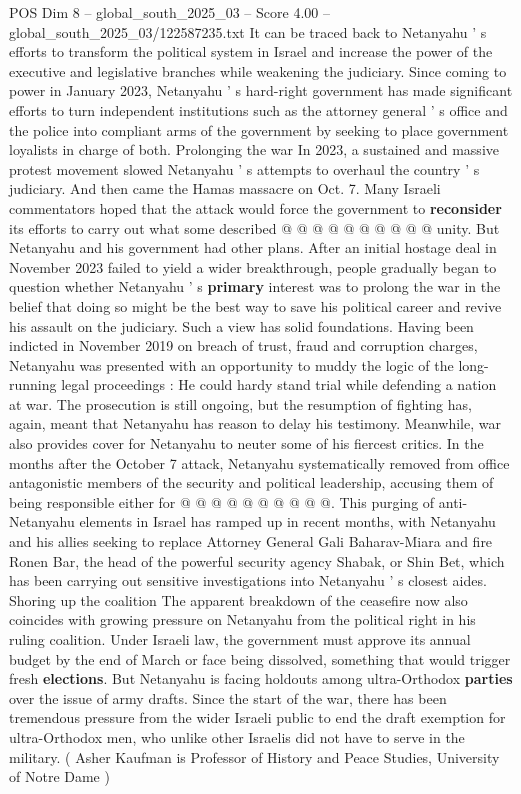 \begin{textsample}{POS Dim 8 – global\_south\_2025\_03 – Score 4.00 – global\_south\_2025\_03/122587235.txt}
It can be traced back to Netanyahu ' s efforts to transform the political system in Israel and increase the power of the executive and legislative branches while weakening the judiciary.
Since coming to power in January 2023, Netanyahu ' s hard-right government has made significant efforts to turn independent institutions such as the attorney general ' s office and the police into compliant arms of the government by seeking to place government loyalists in charge of both.
Prolonging the war In 2023, a sustained and massive protest movement slowed Netanyahu ' s attempts to overhaul the country ' s judiciary.
And then came the Hamas massacre on Oct. 7.
Many Israeli commentators hoped that the attack would force the government to \textbf{reconsider} its efforts to carry out what some described @ @ @ @ @ @ @ @ @ @ unity.
But Netanyahu and his government had other plans.
After an initial hostage deal in November 2023 failed to yield a wider breakthrough, people gradually began to question whether Netanyahu ' s \textbf{primary} interest was to prolong the war in the belief that doing so might be the best way to save his political career and revive his assault on the judiciary.
Such a view has solid foundations.
Having been indicted in November 2019 on breach of trust, fraud and corruption charges, Netanyahu was presented with an opportunity to muddy the logic of the long-running legal proceedings : He could hardy stand trial while defending a nation at war.
The prosecution is still ongoing, but the resumption of fighting has, again, meant that Netanyahu has reason to delay his testimony.
Meanwhile, war also provides cover for Netanyahu to neuter some of his fiercest critics.
In the months after the October 7 attack, Netanyahu systematically removed from office antagonistic members of the security and political leadership, accusing them of being responsible either for @ @ @ @ @ @ @ @ @ @.
This purging of anti-Netanyahu elements in Israel has ramped up in recent months, with Netanyahu and his allies seeking to replace Attorney General Gali Baharav-Miara and fire Ronen Bar, the head of the powerful security agency Shabak, or Shin Bet, which has been carrying out sensitive investigations into Netanyahu ' s closest aides.
Shoring up the coalition The apparent breakdown of the ceasefire now also coincides with growing pressure on Netanyahu from the political right in his ruling coalition.
Under Israeli law, the government must approve its annual budget by the end of March or face being dissolved, something that would trigger fresh \textbf{elections}.
But Netanyahu is facing holdouts among ultra-Orthodox \textbf{parties} over the issue of army drafts.
Since the start of the war, there has been tremendous pressure from the wider Israeli public to end the draft exemption for ultra-Orthodox men, who unlike other Israelis did not have to serve in the military. ( Asher Kaufman is Professor of History and Peace Studies, University of Notre Dame )

\end{textsample}
